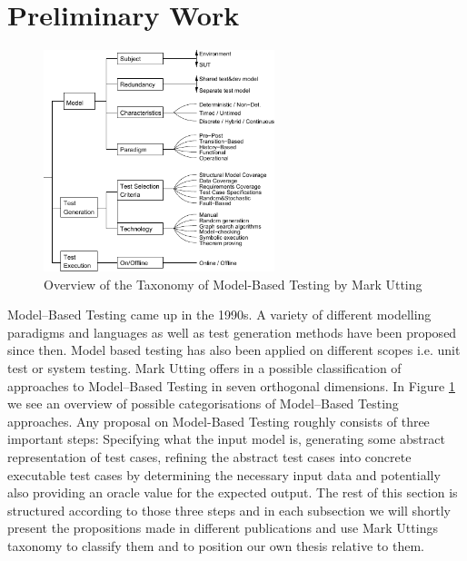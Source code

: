 \section{Preliminary Work}
\label{sec:RelatedWork}
\begin{figure}
\begin{center}
\includegraphics[width=0.6\textwidth]{./pics/taxonomyOfMBT.pdf}
\end{center}
\caption{Overview of the Taxonomy of Model-Based Testing by Mark Utting \cite{utting2006taxonomy}}
\label{fig:UttingTaxonomy}
\end{figure}
Model--Based Testing came up in the 1990s. A variety of different modelling paradigms and languages as well as test generation methods have been proposed since then. Model based testing has also been applied on different scopes i.e. unit test or system testing. Mark Utting offers in \cite{utting2006taxonomy} a possible classification of approaches to Model--Based Testing in seven orthogonal dimensions. In Figure \ref{fig:UttingTaxonomy} we see an overview of possible categorisations of Model--Based Testing approaches. Any proposal on Model-Based Testing roughly consists of three important steps: Specifying what the input model is, generating some abstract representation of test cases, refining the abstract test cases into concrete executable test cases by determining the necessary input data and potentially also providing an oracle value for the expected output. The rest of this section is structured according to those three steps and in each subsection we will shortly present the propositions made in different publications and use Mark Uttings taxonomy to classify them and to position our own thesis relative to them.
% 
